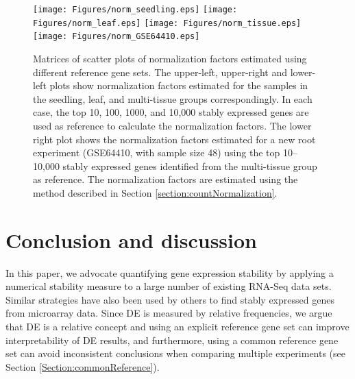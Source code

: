 \documentclass[letterpaper,12pt]{article}
\begin{document}
			\begin{figure}[!ht]
				\begin{center}
					\texttt{[image: Figures/norm\_seedling.eps]}
					\texttt{[image: Figures/norm\_leaf.eps]}
					\texttt{[image: Figures/norm\_tissue.eps]}
					\texttt{[image: Figures/norm\_GSE64410.eps]}
					\caption[Matrices of scatter plots of normalization factors
					estimated using different reference gene sets]{Matrices of scatter plots of 
						normalization factors
						estimated using different reference gene sets. 
						The upper-left, upper-right and lower-left plots show
						normalization factors estimated for the samples in the
						seedling, leaf, and multi-tissue groups correspondingly. 
						In each case, the top 10, 100, 1000, and 10,000 stably
						expressed genes are used as reference to
						calculate the normalization factors.
						The lower right plot shows the normalization factors estimated for a new 
						root
						experiment (GSE64410, with sample size 48) using the top 10--10,000
						stably expressed genes identified from the multi-tissue group as
						reference. The normalization factors are estimated using the
						method described in Section \ref{section:countNormalization}.}
					\label{fig:normfactor} \end{center} \end{figure}
			
			\section{Conclusion and discussion}\label{section:discussion}
			
			In this paper, we advocate quantifying gene expression stability by applying a
			numerical stability measure to a large number of existing RNA-Seq data sets.
			Similar strategies have also been used by others to find stably expressed
			genes from microarray data. Since DE is measured by relative frequencies, we
			argue that DE is a relative concept and using an explicit reference gene set
			can improve interpretability of DE results, and furthermore,  using a common
			reference gene set can avoid inconsistent conclusions when comparing multiple
			experiments (see Section \ref{Section:commonReference}).
			
			
\end{document}
